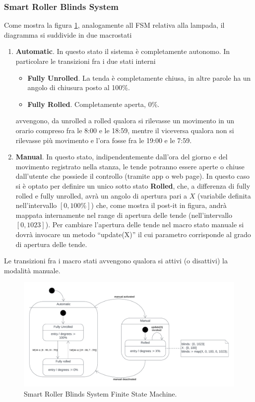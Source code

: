\documentclass[a4paper,12pt]{report}
\begin{document}
\subsubsection{Smart Roller Blinds System}
Come mostra la figura \ref{fig:FSMSmartBlinds}, analogamente all FSM relativa alla lampada, il diagramma si suddivide in due macrostati
\begin{enumerate}
    \item \textbf{Automatic}. In questo stato il sistema è completamente autonomo. In particolare le transizioni fra i due stati interni 
    \begin{itemize}
        \item \textbf{Fully Unrolled}. La tenda è completamente chiusa, in altre parole ha un angolo di  chiusura posto al 100\%. 
        \item \textbf{Fully Rolled}. Completamente aperta, 0\%.
    \end{itemize}
    avvengono, da unrolled a rolled qualora si rilevasse un movimento in un orario compreso fra le 8:00 e le 18:59, mentre il viceversa qualora non si rilevasse più movimento e l'ora fosse fra le 19:00 e le 7:59.
    \item \textbf{Manual}. In questo stato, indipendentemente dall'ora del giorno e del movimento registrato nella stanza, le tende potranno essere aperte o chiuse dall'utente che possiede il controllo (tramite app o web page). In questo caso si è optato per definire un unico sotto stato \textbf{Rolled}, che, a differenza di fully rolled e fully unrolled, avrà un angolo di apertura pari a $X$ (variabile definita nell'intervallo $[0, 100\%]$) che, come mostra il post-it in figura, andrà mappata internamente nel range di apertura delle tende (nell'intervallo $[0, 1023]$). Per cambiare l'apertura delle tende nel macro stato manuale si dovrà invocare un metodo ``update(X)'' il cui parametro corrisponde al grado di apertura delle tende.
\end{enumerate}
Le transizioni fra i macro stati avvengono qualora si attivi (o disattivi) la modalità manuale.

\begin{figure}[H]
\centering
\includegraphics[width=\textwidth]{img/State - roller blinds.png}
\caption{Smart Roller Blinds System Finite State Machine.}
\label{fig:FSMSmartBlinds}
\end{figure}
\end{document}
